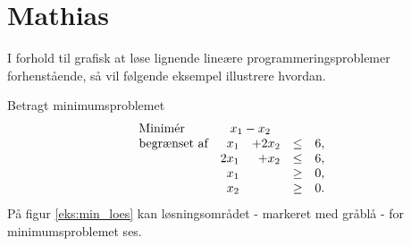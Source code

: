\section{Mathias}

I forhold til grafisk at løse lignende lineære programmeringsproblemer forhenstående, så vil følgende eksempel illustrere hvordan. 

\begin{eks}
\label{eks:min_loes}
Betragt minimumsproblemet
%
\begin{align*}
\begin{array}{lrrlr}
\text{Minimér}		&	\multicolumn{2}{c}{x_1-x_2}  &\\
\text{begrænset af}	&x_1& + 2x_2			&\leq 	& 6,\\
					&2x_1& + x_2			&\leq	& 6,\\
					&x_1&    				&\geq	& 0,\\
					&x_2&    				&\geq	& 0.\\
\end{array}
\end{align*}
%
På figur \ref{eks:min_loes} kan løsningsområdet - markeret med gråblå - for minimumsproblemet ses.
%

\end{eks}